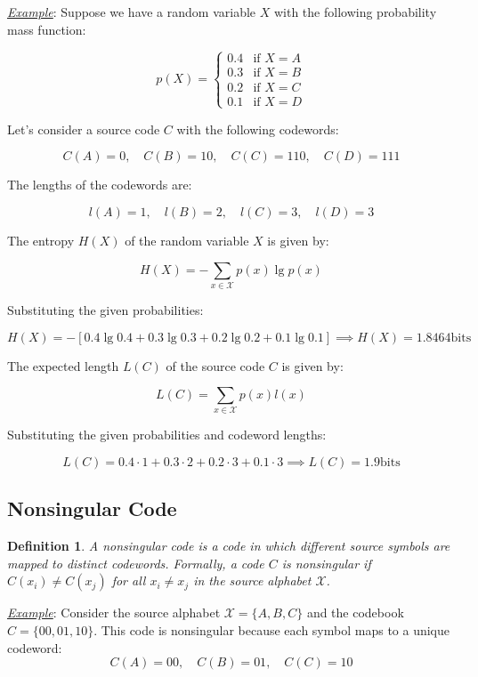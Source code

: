 \documentclass[a4paper,10pt]{article}
\newtheorem{definition}{Definition}[section] %
\newcommand{\hlt}[1]{\colorbox{color3}{#1}}
\begin{document}
\noindent \underline{\textit{Example}}: Suppose we have a random variable \( X \) with the following probability mass function:

\[
p(X) = \begin{cases}
0.4 & \text{if } X = A \\
0.3 & \text{if } X = B \\
0.2 & \text{if } X = C \\
0.1 & \text{if } X = D
\end{cases}
\]

Let's consider a source code \( C \) with the following codewords:

\[
C(A) = 0, \quad C(B) = 10, \quad C(C) = 110, \quad C(D) = 111
\]

The lengths of the codewords are:

\[
l(A) = 1, \quad l(B) = 2, \quad l(C) = 3, \quad l(D) = 3
\]

The entropy \( H(X) \) of the random variable \( X \) is given by:

\[
H(X) = - \sum_{x \in \mathcal{X}} p(x) \lg p(x)
\]

Substituting the given probabilities:

\[
H(X) = - [0.4 \lg 0.4 + 0.3 \lg 0.3 + 0.2 \lg 0.2 + 0.1 \lg 0.1] \implies H(X) = 1.8464 \text{bits}
\]

The expected length \( L(C) \) of the source code \( C \) is given by:

\[
L(C) = \sum_{x \in \mathcal{X}} p(x) l(x)
\]

Substituting the given probabilities and codeword lengths:

\[
L(C) = 0.4 \cdot 1 + 0.3 \cdot 2 + 0.2 \cdot 3 + 0.1 \cdot 3 \implies L(C) = 1.9 \text{bits}
\]

\subsection{Nonsingular Code}

\begin{definition}
    A \hlt{nonsingular code} is a code in which different source symbols are mapped to distinct codewords. Formally, a code $C$ is nonsingular if $C(x_i) \neq C(x_j)$ for all $x_i \neq x_j$ in the source alphabet $\mathcal{X}$.
\end{definition}

\noindent \underline{\textit{Example}}: Consider the source alphabet $\mathcal{X} = \{A, B, C\}$ and the codebook $C = \{00, 01, 10\}$. This code is nonsingular because each symbol maps to a unique codeword:
\[
C(A) = 00, \quad C(B) = 01, \quad C(C) = 10
\]
\end{document}
